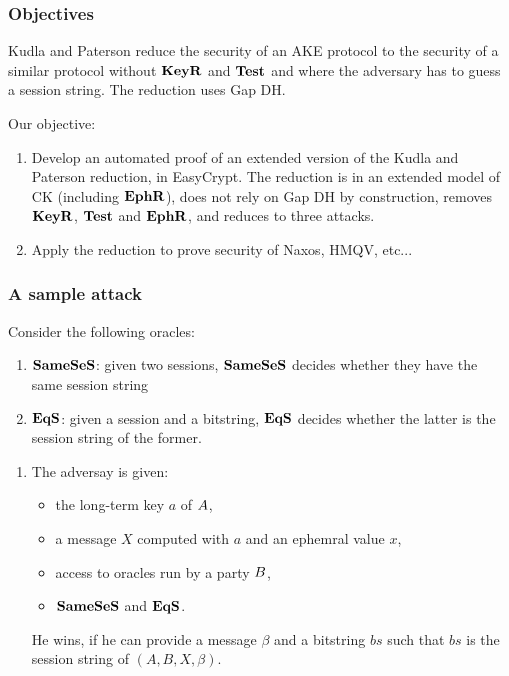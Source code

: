 \documentclass[notes,page number]{beamer}
\begin{document}
\begin{frame}
  \frametitle{Objectives} Kudla and Paterson reduce the security of an
  AKE protocol to the security of a similar protocol without
  $\mathbf{KeyR}$ and $\mathbf{Test}$ and where the adversary has to guess
  a session string. The reduction uses Gap DH.

Our objective:
\begin{enumerate}
\item Develop an automated proof of an extended version of the Kudla
  and Paterson reduction, in EasyCrypt. The reduction is in an extended
  model of CK (including $\mathbf{EphR}$), does not rely on Gap DH by
  construction, removes $\mathbf{KeyR}$, $\mathbf{Test}$ and
  $\mathbf{EphR}$,
  and reduces to three attacks.
\item Apply the reduction to prove security of Naxos, HMQV, etc...
\end{enumerate}

\end{frame}
\begin{frame}
  \frametitle{A sample attack}
Consider the following oracles:
 \begin{enumerate}
  \item $\mathbf{SameSeS}$: given two sessions, $\mathbf{SameSeS}$ decides whether they have
    the same session string
  \item $\mathbf{EqS}$: given a session and a bitstring, $\mathbf{EqS}$ decides whether
    the latter is the session string of the former.
  \end{enumerate}
\begin{enumerate}
\item The adversay is given:
  \begin{itemize}
  \item  the long-term key $a$ of ${A}$,
  \item a message $X$ computed with $a$ and an ephemral value $x$,
  \item access to oracles run by a party ${B}$,
  \item $\mathbf{SameSeS}$ and $\mathbf{EqS}$.
  \end{itemize}
He wins, if he can provide a message $\beta$ and a bitstring $bs$ such that
$bs$ is the session string of $(A,B,X,\beta)$. 
 
\end{enumerate}
\end{frame}
\end{document}

